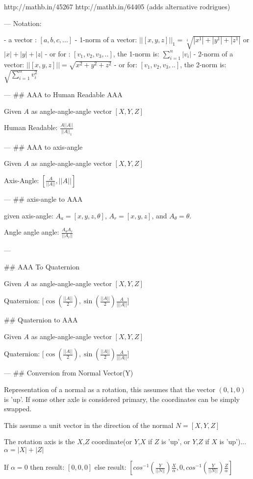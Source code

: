 http://mathb.in/45267
http://mathb.in/64405 (adds alternative rodrigues)


---
Notation:
 
 - a vector : $[a,b,c,...]$
 - 1-norm of a vector: $ ||[x,y,z]||_1 = \sqrt[1] {|x^1|+|y^1|+|z^1|} $ or $ |x|+|y|+|z| $ 
     - or for : $ [v_1,v_2,v_3,..] $, the 1-norm is: $ \sum_{i=1}^n |v_i|  $
 - 2-norm of a vector: $ ||[x,y,z]|| = \sqrt { x^2+y^2+z^2 } $
   - or for: $ [v_1,v_2,v_3,..] $, the 2-norm is: $ \sqrt { \sum_{i=1}^n v_i^2 } $

---
## AAA to Human Readable AAA

Given $A$ as angle-angle-angle vector $[{X},{Y} ,{Z}] $ 

Human Readable: $ \frac { A ||A|| } {||A||_1} $

---
## AAA to axis-angle

Given $A$ as angle-angle-angle vector $[{X},{Y} ,{Z}] $ 

Axis-Angle: $ [ \frac {A} {||A||}, ||{A}|| ] $

---
## axis-angle to AAA

given axis-angle:
$ A_a =[ {x},{y},{z},{{\theta}}]  $, $A_r=[x,y,z]$, and $A_\theta = \theta$.

Angle angle angle: $   \frac  {{A_\theta}A_r} {||A_r||} $

---


## AAA To Quaternion

Given $A$ as angle-angle-angle vector $[{X},{Y} ,{Z}]$

Quaternion: [$\cos(\frac {||A||} {2} ),  \sin ( \frac {||A||} {2} ) \frac A {|||A||} $]


## Quaternion to AAA

Given $A$ as angle-angle-angle vector $[{X},{Y} ,{Z}]$

Quaternion: [$\cos(\frac {||A||} {2} ),  \sin ( \frac {||A||} {2} ) \frac A {|||A||} $]


---
## Conversion from Normal Vector(Y)

Representation of a normal as a rotation, this assumes that the vector $(0,1,0)$ is 'up'.  If some other axle is considered primary, the coordinates can be simply swapped.

This assume a unit vector in the direction of the normal
$N = [ X, Y, Z ]$


The rotation axis is the $X$,$Z$ coordinate(or $Y$,$X$ if $Z$ is 'up', or $Y$,$Z$ if $X$ is 'up')...
$   \alpha = |X| + |Z|$

If $\alpha = 0$ then result: $[0,0,0]$
else result: $ [      cos^{-1}( \frac {Y} {||N||} ) \frac X \alpha, 	0, cos^{-1}( \frac Y {||N||}) \frac Z \alpha ] $

